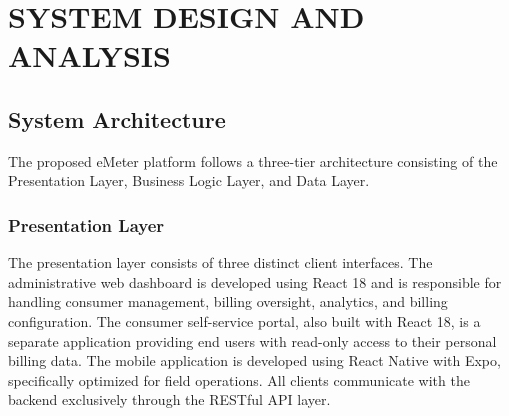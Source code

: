 \documentclass[12pt, a4paper, onecolumn]{report}
\begin{document}
\begin{table}[htbp]
\centering
\small
{}
\caption{eMeter Hardware Requirements}
\end{table}

\chapter{SYSTEM DESIGN AND ANALYSIS}

\section{System Architecture}

The proposed eMeter platform follows a three-tier architecture consisting of the Presentation Layer, Business Logic Layer, and Data Layer.

\subsection{Presentation Layer}
The presentation layer consists of three distinct client interfaces. The administrative web dashboard is developed using React 18 and is responsible for handling consumer management, billing oversight, analytics, and billing configuration. The consumer self-service portal, also built with React 18, is a separate application providing end users with read-only access to their personal billing data. The mobile application is developed using React Native with Expo, specifically optimized for field operations. All clients communicate with the backend exclusively through the RESTful API layer.
\end{document}
